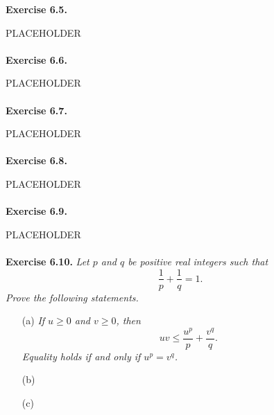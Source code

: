 \documentclass{article}
\begin{document}



\textbf{Exercise 6.5.}

PLACEHOLDER \\\\






\textbf{Exercise 6.6.}

PLACEHOLDER \\\\






\textbf{Exercise 6.7.}

PLACEHOLDER \\\\






\textbf{Exercise 6.8.}

PLACEHOLDER \\\\






\textbf{Exercise 6.9.}

PLACEHOLDER \\\\






\textbf{Exercise 6.10.}
\emph{Let $p$ and $q$ be positive real integers such that
\[
  \frac{1}{p} + \frac{1}{q} = 1.
\]
Prove the following statements.}
\begin{enumerate}
  \item[(a)]
  \emph{If $u \geq 0$ and $v \geq 0$, then
  \[
    uv \leq \frac{u^p}{p} + \frac{v^q}{q}.
  \]
  Equality holds if and only if $u^p = v^q$.}

  \item[(b)]

  \item[(c)]
\end{enumerate}
\end{document}
